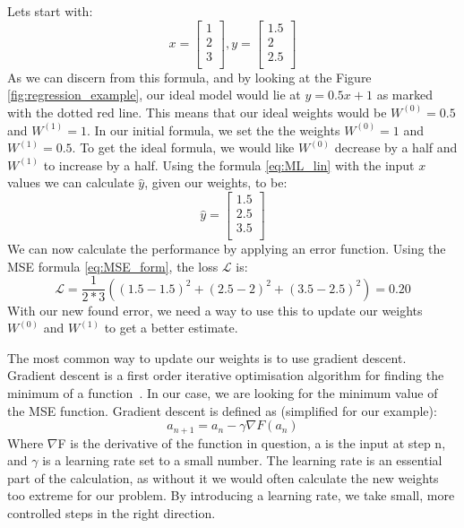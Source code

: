 \vspace{5px}
Lets start with: 
\begin{equation}
    x=\left[ \begin{array}{c} 1\\ 2\\ 3\\ \end{array} \right],
    y=\left[\begin{array}{c} 1.5\\2\\ 2.5\\\end{array}\right]
\label{eq:input}
\end{equation}
As we can discern from this formula, and by looking at the Figure \ref{fig:regression_example}, our ideal model would lie at $y=0.5x + 1$ as marked with the dotted red line. This means that our ideal weights would be  $W^{(0)}=0.5$ and $W^{(1)}=1$.
In our initial formula, we set the the weights $W^{(0)}=1$ and $W^{(1)}=0.5$. To get the ideal formula, we would like $W^{(0)}$ decrease by a half and $W^{(1)}$ to increase by a half.
Using the formula \ref{eq:ML_lin} with the input $x$ values we can calculate $\hat{y}$, given our weights, to be:
\begin{equation}
    \hat{y}=\left[\begin{array}{c} 1.5\\ 2.5\\ 3.5\\ \end{array}\right]
\end{equation}
We can now calculate the performance by applying an error function. Using the MSE formula \ref{eq:MSE_form}, the loss $\mathcal{L}$ is:
\begin{equation}
   \mathcal{L} = \frac{1}{2*3} \left( {(1.5-1.5)}^2+{(2.5-2)}^2+{(3.5-2.5)}^2 \right) = 0.20
\end{equation}
With our new found error, we need a way to use this to update our weights $W^{(0)}$ and $W^{(1)}$ to get a better estimate. 
    

\noindent The most common way to update our weights is to use gradient descent. 
Gradient descent is a first order iterative optimisation algorithm for finding the minimum of a function~\cite{robbins1951}. In our case, we are looking for the minimum value of the MSE function. Gradient descent is defined as (simplified for our example):
\begin{equation}
    a_{n+1}= a_{n} - \gamma \nabla F(a_{n})
    \label{eq:gradientdecent}
\end{equation}
Where $\nabla$F is the derivative of the function in question, a is the input at step n, and $\gamma$ is a learning rate set to a small number. The learning rate is an essential part of the calculation, as without it we would often calculate the new weights too extreme for our problem. By introducing a learning rate, we take small, more controlled steps in the right direction. 

